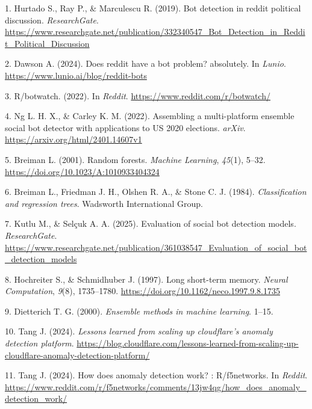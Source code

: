 \documentclass[
  12pt,
  letterpaper,
  DIV=11,
  numbers=noendperiod]{scrartcl}
\newlength{\cslhangindent}
\newenvironment{CSLReferences}[2] %
 {\begin{list}{}{%
  \setlength{\itemindent}{0pt}
  \setlength{\leftmargin}{0pt}
  \setlength{\parsep}{0pt}
  \ifodd #1
   \setlength{\leftmargin}{\cslhangindent}
   \setlength{\itemindent}{-1\cslhangindent}
  \fi
  \setlength{\itemsep}{#2\baselineskip}}}
 {\end{list}}
\begin{document}
\label{refs}
\begin{CSLReferences}{1}{0}
1. Hurtado S., Ray P., \& Marculescu R. (2019). Bot detection in reddit
political discussion. \emph{ResearchGate}.
\url{https://www.researchgate.net/publication/332340547_Bot_Detection_in_Reddit_Political_Discussion}

2. Dawson A. (2024). Does reddit have a bot problem? absolutely. In
\emph{Lunio}. \url{https://www.lunio.ai/blog/reddit-bots}

3. R/botwatch. (2022). In \emph{Reddit}.
\url{https://www.reddit.com/r/botwatch/}

4. Ng L. H. X., \& Carley K. M. (2022). Assembling a multi-platform
ensemble social bot detector with applications to US 2020 elections.
\emph{arXiv}. \url{https://arxiv.org/html/2401.14607v1}

5. Breiman L. (2001). Random forests. \emph{Machine Learning},
\emph{45}(1), 5--32. \url{https://doi.org/10.1023/A:1010933404324}

6. Breiman L., Friedman J. H., Olshen R. A., \& Stone C. J. (1984).
\emph{Classification and regression trees}. Wadsworth International
Group.

7. Kutlu M., \& Selçuk A. A. (2025). Evaluation of social bot detection
models. \emph{ResearchGate}.
\url{https://www.researchgate.net/publication/361038547_Evaluation_of_social_bot_detection_models}

8. Hochreiter S., \& Schmidhuber J. (1997). Long short-term memory.
\emph{Neural Computation}, \emph{9}(8), 1735--1780.
\url{https://doi.org/10.1162/neco.1997.9.8.1735}

9. Dietterich T. G. (2000). \emph{Ensemble methods in machine learning}.
1--15.

10. Tang J. (2024). \emph{Lessons learned from scaling up cloudflare's
anomaly detection platform}.
\url{https://blog.cloudflare.com/lessons-learned-from-scaling-up-cloudflare-anomaly-detection-platform/}

11. Tang J. (2024). How does anomaly detection work? : R/f5networks. In
\emph{Reddit}.
\url{https://www.reddit.com/r/f5networks/comments/13jw4qg/how_does_anomaly_detection_work/}


\end{CSLReferences}
\end{document}
